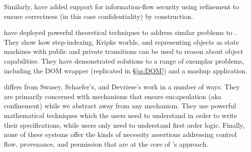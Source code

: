 %
Similarly, \cite{schaeferCbC} have
added  support for information-flow security %
using refinement to ensure correctness (in this case confidentiality) by
construction. 





\cite{dd}  have deployed
   powerful %
  theoretical techniques to address similar problems to \Nec.  %
  They show how step-indexing, Kripke worlds, and representing objects
as state machines with public and private transitions can be used to
reason about %
object capabilities.
They have demonstrated solutions to a range of exemplar problems,
including the DOM wrapper (replicated in 
\S\ref{ss:DOM}) and a mashup application.

 

\Nec differs from Swasey, Schaefer's, and Devriese's work in a number of ways:
They are primarily concerned with %
mechanisms that ensure encapsulation (aka 
confinement) while we abstract away from any mechanism.
They use powerful mathematical techniques
which  the users need  to understand in order to write their specifications,
while \Nec users only need  to understand  first order logic.
Finally, none of these systems offer the kinds of
necessity assertions addressing control flow, provenance, and permission 
that are at the core of \Nec's approach.



